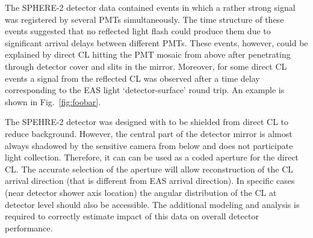 \documentclass[a4paper,11pt]{article}
\begin{document}
The SPHERE-2 detector data contained events in which a rather strong signal was registered by several PMTs simultaneously. The time structure of these events suggested that no reflected light flash could produce them due to significant arrival delays between different PMTs. These events, however, could be explained by direct CL hitting the PMT mosaic from above after penetrating through detector cover and slits in the mirror. Moreover, for some direct CL events a signal from the reflected CL was observed after a time delay corresponding to the EAS light `detector-surface' round trip. An example is shown in Fig.~\ref{fig:foobar}.



The SPEHRE-2 detector was designed with to be shielded from direct CL to reduce background. However, the central part of the detector mirror is almost always shadowed by the sensitive camera from below and does not participate light collection. Therefore, it can can be used as a coded aperture for the direct CL. The accurate selection of the aperture will allow reconstruction of the CL arrival direction (that is different from EAS arrival direction). In specific cases (near detector shower axis location) the angular distribution of the CL at detector level should also be accessible. The additional modeling and analysis is required to correctly estimate impact of this data on overall detector performance.
\end{document}
